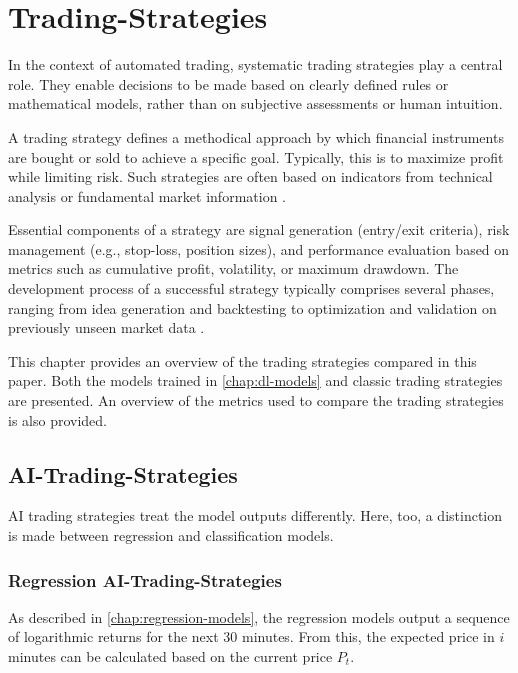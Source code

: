 \section{Trading-Strategies}

In the context of automated trading, systematic trading strategies play a central role.
They enable decisions to be made based on clearly defined rules or mathematical models, rather than on subjective assessments or human intuition.

A trading strategy defines a methodical approach by which financial instruments are bought or sold to achieve a specific goal.
Typically, this is to maximize profit while limiting risk.
Such strategies are often based on indicators from technical analysis or fundamental market information \cite{investopia-trading-strategy}.

Essential components of a strategy are signal generation (entry/exit criteria), risk management (e.g., stop-loss, position sizes), and performance evaluation based on metrics such as cumulative profit, volatility, or maximum drawdown.
The development process of a successful strategy typically comprises several phases, ranging from idea generation and backtesting to optimization and validation on previously unseen market data \cite{investopia-trading-strategy-components}.

This chapter provides an overview of the trading strategies compared in this paper.
Both the models trained in \autoref{chap:dl-models} and classic trading strategies are presented.
An overview of the metrics used to compare the trading strategies is also provided.

\subsection{AI-Trading-Strategies}

AI trading strategies treat the model outputs differently.
Here, too, a distinction is made between regression and classification models.

\subsubsection{Regression AI-Trading-Strategies}

As described in \autoref{chap:regression-models}, the regression models output a sequence of logarithmic returns for the next 30 minutes.
From this, the expected price in $i$ minutes can be calculated based on the current price $P_t$.

